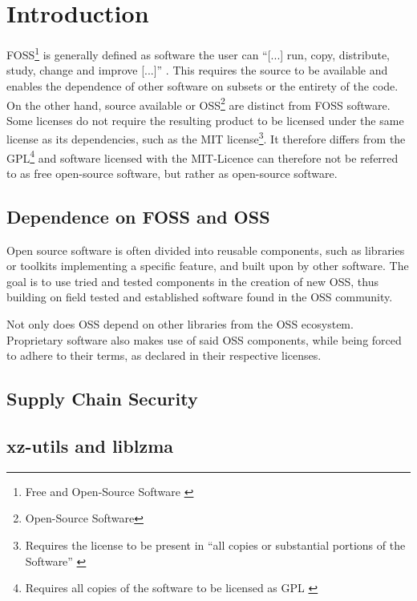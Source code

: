 \section{Introduction}

FOSS\footnote{Free and Open-Source Software \cite{stallmann2021copyleft}} is
generally defined as software the user can ``[...] run, copy, distribute,
study, change and improve [...]'' \cite{fsf2024whycopylef}. This requires the
source to be available and enables the dependence of other software on subsets
or the entirety of the code. On the other hand, source available or
OSS\footnote{Open-Source Software} are distinct from FOSS software. Some
licenses do not require the resulting product to be licensed under the same
license as its dependencies, such as the MIT license\footnote{Requires the
license to be present in ``all copies or substantial portions of the Software''
\cite{osorg2024mit}}. It therefore differs from the GPL\footnote{Requires all
copies of the software to be licensed as GPL \cite{osorg2024gpl}} and software
licensed with the MIT-Licence can therefore not be referred to as free
open-source software, but rather as open-source software.



\subsection{Dependence on FOSS and OSS}

Open source software is often divided into reusable components, such as
libraries or toolkits implementing a specific feature, and built upon by other
software. The goal is to use tried and tested components in the creation of new
OSS, thus building on field tested and established software found in the OSS
community.

Not only does OSS depend on other libraries from the OSS ecosystem. Proprietary
software also makes use of said OSS components, while being forced to adhere to
their terms, as declared in their respective licenses.

\subsection{Supply Chain Security}

\cite{ccc2024supplychainsec}

\subsection{xz-utils and liblzma}

\cite{ccc2024backdoor}
